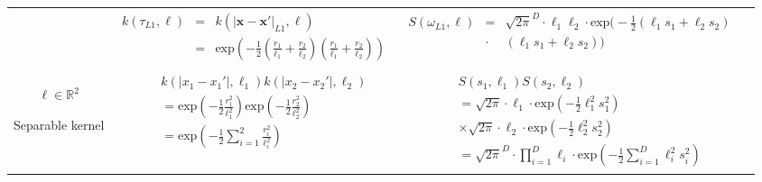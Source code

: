 \documentclass[onecolumn,a4paper,11pt]{article}
\begin{document}
\begin{landscape}
\begin{table}[H]
\begin{center}
\begin{tabular}{|c|c|c|c|}
         & \multicolumn{1}{|p{8.2cm}|}{
         \begin{eqnarray*}
		k(\tau_{L1},\bm{\ell}) &=& k(|\bm{x}-\bm{x}'|_{L1},\bm{\ell})\\
		&=& \mathrm{exp}\left(-\frac{1}{2} \left(\frac{r_1}{\ell_1} + \frac{r_2}{\ell_2}\right)\left(\frac{r_1}{\ell_1} + \frac{r_2}{\ell_2}\right) \right)
         \end{eqnarray*}
       }
       
       & \multicolumn{1}{|p{8.2cm}|}{
         \begin{eqnarray*}
		S(\omega_{L1},\bm{\ell}) &=& \sqrt{2\pi}^D \cdot \ell_1 \ell_2 \cdot \mathrm{exp}\Big(-\frac{1}{2} (\ell_1 s_1 + \ell_2 s_2)\\
		&\cdot &(\ell_1 s_1 + \ell_2 s_2) \Big) \\
         \end{eqnarray*}
       }
		
       & \multicolumn{1}{|p{5.2cm}|}{

       } \\  
       \vspace{-15mm}\\
       \cline{1-3}
       
       \multicolumn{1}{|p{1.5cm}|}{
       \vspace{1mm}
        $\bm{\ell} \in \mathbb{R}^2$
        
       {Separable kernel} 
       }
       
        & \multicolumn{1}{|p{8.2cm}|}{
         \begin{eqnarray*}
		&&k(|x_1-x_1'|,\ell_1)k(|x_2-x_2'|,\ell_2) \\
		&&= \mathrm{exp}\left(-\frac{1}{2} \frac{r_1^2}{\ell_1^2} \right) \mathrm{exp}\left(-\frac{1}{2} \frac{r_2^2}{\ell_2^2} \right)\\
		&&= \mathrm{exp}\left(-\frac{1}{2} \sum_{i=1}^{2}\frac{r_i^2}{\ell_i^2} \right)
         \end{eqnarray*}
       }
       
       & \multicolumn{1}{|p{8.2cm}|}{
       \begin{eqnarray*}
		&&S(s_1,\ell_1)S(s_2,\ell_2) \\
		&&= \sqrt{2\pi} \cdot \ell_1 \cdot \mathrm{exp}\left(-\frac{1}{2} \ell_1^2 s_1^2 \right) \\
		&& \times \sqrt{2\pi} \cdot \ell_2 \cdot \mathrm{exp}\left(-\frac{1}{2} \ell_2^2 s_2^2 \right)\\
		&&= \sqrt{2\pi}^D \cdot \prod_{i=1}^D \ell_i \cdot \mathrm{exp}\left(-\frac{1}{2} \sum_{i=1}^D \ell_i^2 s_i^2 \right)
		\end{eqnarray*}
       } 


\end{tabular}
\end{center}
\end{table}
\end{landscape}
\end{document}
